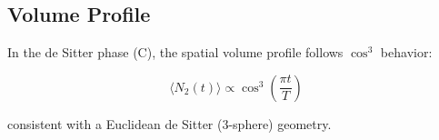 
\subsection{Volume Profile}

In the de Sitter phase (C), the spatial volume profile follows $\cos^3$ behavior:

\begin{equation}
\langle N_2(t) \rangle \propto \cos^3\!\left(\frac{\pi t}{T}\right)
\end{equation}

consistent with a Euclidean de Sitter (3-sphere) geometry.
